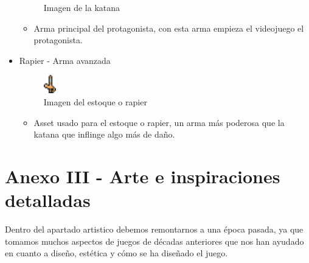 \documentclass[a4paper]{article}
\begin{document}
\begin{appendices}
\begin{itemize}
\begin{figure}[!ht]
            \caption{Imagen de la katana}
            \label{fig:player}
        \end{figure}
        \begin{itemize}
            \item Arma principal del protagonista, con esta arma empieza el videojuego el protagonista.
        \end{itemize}
        \item Rapier - Arma avanzada
        \begin{figure}[!ht]
            \centering
            \includegraphics[width=0.05\textwidth]{Images/rapier.png}
            \caption{Imagen del estoque o rapier}
            \label{fig:player}
        \end{figure}
        \begin{itemize}
            \item Asset usado para el estoque o rapier, un arma más poderosa que la katana que inflinge algo más de daño.
        \end{itemize}
    \end{itemize}
    \clearpage

    \section{Anexo III - Arte e inspiraciones detalladas}
    Dentro del apartado artistico debemos remontarnos a una época pasada, ya que tomamos muchos aspectos de juegos de décadas anteriores que nos han ayudado en cuanto a diseño, estética y cómo se ha
    diseñado el juego.


\end{appendices}
\end{document}
